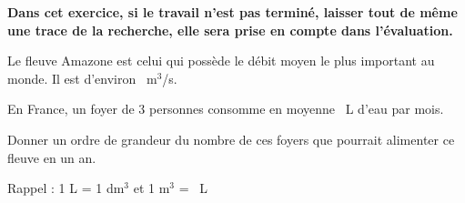 
\medskip 

\textbf{Dans cet exercice, si le travail n'est pas terminé, laisser tout de même une trace de la recherche, elle sera prise en compte dans l'évaluation.}

\medskip 

Le fleuve Amazone est celui qui possède le débit moyen le plus important au monde. Il est d'environ ~m$^3$/s. 

En France, un foyer de 3 personnes consomme en moyenne ~L d'eau par mois. 

Donner un ordre de grandeur du nombre de ces foyers que pourrait alimenter ce fleuve en un an. 

Rappel : 1 L = 1 dm$^3$ et 1 m$^3$ = ~L 

\bigskip

